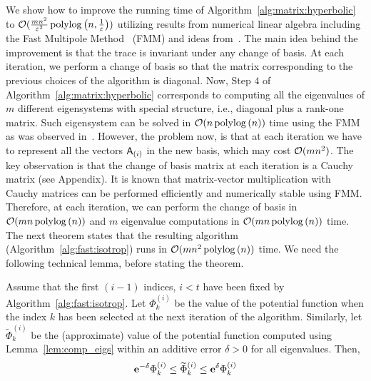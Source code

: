 %
We show how to improve the running time of Algorithm~\ref{alg:matrix:hyperbolic} to $\mathcal{O}(\frac{mn^2}{\varepsilon^2} \operatorname{polylog}\left(n, \frac1{\varepsilon}\right))$ utilizing results from numerical linear algebra including the Fast Multipole Method~\cite{FMM:CGR} (FMM) and ideas from~\cite{Gu:update}. The main idea behind the improvement is that the trace is invariant under any change of basis. At each iteration, we perform a change of basis so that the matrix corresponding to the previous choices of the algorithm is diagonal. Now, Step $4$ of Algorithm~\ref{alg:matrix:hyperbolic} corresponds to computing all the eigenvalues of $m$ different eigensystems with special structure, i.e., diagonal plus a rank-one matrix. Such eigensystem can be solved in $\mathcal{O}(n \operatorname{polylog}\left(n\right))$ time using the FMM as was observed in~\cite{Gu:update}. However, the problem now, is that at each iteration we have to represent all the vectors ${\mathsf{A} }_{(i)}$ in the new basis, which may cost $\mathcal{O}(mn^2)$. The key observation is that the change of basis matrix at each iteration is a Cauchy matrix (see Appendix). It is known that matrix-vector multiplication with Cauchy matrices can be performed efficiently and numerically stable using FMM. Therefore, at each iteration, we can perform the change of basis in $\mathcal{O}(mn\operatorname{polylog}\left(n\right))$ and $m$ eigenvalue computations in $\mathcal{O}(mn\operatorname{polylog}\left(n\right))$ time. The next theorem states that the resulting algorithm (Algorithm~\ref{alg:fast:isotrop}) runs in $\mathcal{O}(mn^2 \operatorname{polylog}\left(n\right))$ time. We need the following technical lemma, before stating the theorem.
%
%
%
%
%
\begin{lemma}\label{lem:technical_cosh}
Assume that the first $(i-1)$ indices, $i< t$ have been fixed by Algorithm~\ref{alg:fast:isotrop}. Let $\Phi_k^{(i)}$ be the value of the potential function when the index $k$ has been selected at the next iteration of the algorithm. Similarly, let $\widetilde{\Phi}_k^{(i)}$ be the (approximate) value of the potential function computed using Lemma~\ref{lem:comp_eigs} within an additive error $\delta>0$ for all eigenvalues. Then,
\begin{align*}
	{\mathbf e}^{-\delta} \Phi_k^{(i)} \leq \widetilde{\Phi}^{(i)}_k \leq  {\mathbf e}^{\delta} \Phi_k^{(i)}
\end{align*}
\end{lemma}
%
%
